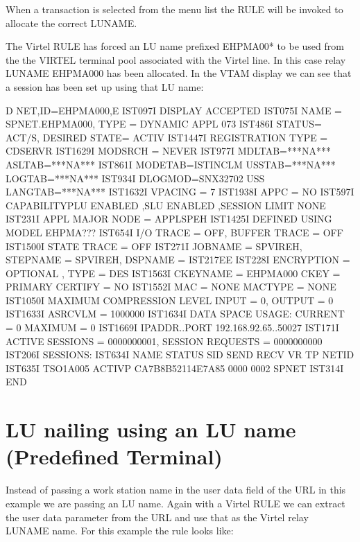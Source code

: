 \documentclass[letterpaper,10pt,english]{sphinxmanual}
\begin{document}

When a transaction is selected from the menu list the RULE will be invoked to allocate the correct LUNAME.


The Virtel RULE has forced an LU name prefixed EHPMA00* to be used from the the VIRTEL terminal pool associated with the Virtel line. In this case relay LUNAME EHPMA000 has been allocated. In the VTAM display we can see that a session has been set up using that LU name:

\begin{sphinxVerbatim}[commandchars=\\\{\}]
D NET,ID=EHPMA000,E
IST097I DISPLAY ACCEPTED
IST075I NAME = SPNET.EHPMA000, TYPE = DYNAMIC APPL 073
IST486I STATUS= ACT/S, DESIRED STATE= ACTIV
IST1447I REGISTRATION TYPE = CDSERVR
IST1629I MODSRCH = NEVER
IST977I MDLTAB=***NA*** ASLTAB=***NA***
IST861I MODETAB=ISTINCLM USSTAB=***NA*** LOGTAB=***NA***
IST934I DLOGMOD=SNX32702 USS LANGTAB=***NA***
IST1632I VPACING = 7
IST1938I APPC = NO
IST597I CAPABILITY\PYGZhy{}PLU ENABLED ,SLU ENABLED ,SESSION LIMIT NONE
IST231I APPL MAJOR NODE = APPLSPEH
IST1425I DEFINED USING MODEL EHPMA???
IST654I I/O TRACE = OFF, BUFFER TRACE = OFF
IST1500I STATE TRACE = OFF
IST271I JOBNAME = SPVIREH, STEPNAME = SPVIREH, DSPNAME = IST217EE
IST228I ENCRYPTION = OPTIONAL , TYPE = DES
IST1563I CKEYNAME = EHPMA000 CKEY = PRIMARY CERTIFY = NO
IST1552I MAC = NONE MACTYPE = NONE
IST1050I MAXIMUM COMPRESSION LEVEL \PYGZhy{} INPUT = 0, OUTPUT = 0
IST1633I ASRCVLM = 1000000
IST1634I DATA SPACE USAGE: CURRENT = 0 MAXIMUM = 0
IST1669I IPADDR..PORT 192.168.92.65..50027
IST171I ACTIVE SESSIONS = 0000000001, SESSION REQUESTS = 0000000000
IST206I SESSIONS:
IST634I NAME STATUS SID SEND RECV VR TP NETID
IST635I TSO1A005 ACTIV\PYGZhy{}P CA7B8B52114E7A85 0000 0002 SPNET
IST314I END
\end{sphinxVerbatim}

\ignorespaces 

\section{LU nailing using an LU name (Predefined Terminal)}
\label{\detokenize{Customization:lu-nailing-using-an-lu-name-predefined-terminal}}\label{\detokenize{Customization:index-58}}
Instead of passing a work station name in the user data field of the URL in this example we are passing an LU name. Again with a Virtel RULE we can extract the user data parameter from the URL and use that as the Virtel relay LUNAME name. For this example the rule looks like:
\end{document}
